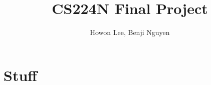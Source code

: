 \documentclass[12pt]{article}
\begin{document}
\title{CS224N Final Project}
\author{Howon Lee, Benji Nguyen}
\maketitle

\section{Stuff} %
\end{document}
